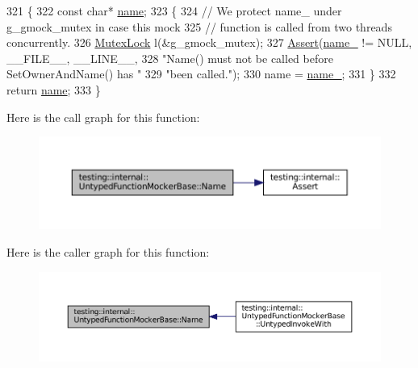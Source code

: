 \begin{DoxyCode}
321                                         \{
322   \textcolor{keyword}{const} \textcolor{keywordtype}{char}* \hyperlink{namespaceinteractive__marker_a447655961b3d3ca3c5a2a9d3d769436d}{name};
323   \{
324     \textcolor{comment}{// We protect name\_ under g\_gmock\_mutex in case this mock}
325     \textcolor{comment}{// function is called from two threads concurrently.}
326     \hyperlink{namespacetesting_1_1internal_a08b187c6cc4e28400aadf9a32fccc8de}{MutexLock} l(&g\_gmock\_mutex);
327     \hyperlink{namespacetesting_1_1internal_a7a259643b7f2d23ce2b757728df42c99}{Assert}(\hyperlink{classtesting_1_1internal_1_1UntypedFunctionMockerBase_a2d472077b9a8d3758caaec5770259f70}{name\_} != NULL, \_\_FILE\_\_, \_\_LINE\_\_,
328            \textcolor{stringliteral}{"Name() must not be called before SetOwnerAndName() has "}
329            \textcolor{stringliteral}{"been called."});
330     name = \hyperlink{classtesting_1_1internal_1_1UntypedFunctionMockerBase_a2d472077b9a8d3758caaec5770259f70}{name\_};
331   \}
332   \textcolor{keywordflow}{return} \hyperlink{namespaceinteractive__marker_a447655961b3d3ca3c5a2a9d3d769436d}{name};
333 \}
\end{DoxyCode}
Here is the call graph for this function\+:
\nopagebreak
\begin{figure}[H]
\begin{center}
\leavevmode
\includegraphics[width=350pt]{classtesting_1_1internal_1_1UntypedFunctionMockerBase_ae90a5b5d48db1e99634bc6ff39ded335_cgraph}
\end{center}
\end{figure}
Here is the caller graph for this function\+:
\nopagebreak
\begin{figure}[H]
\begin{center}
\leavevmode
\includegraphics[width=350pt]{classtesting_1_1internal_1_1UntypedFunctionMockerBase_ae90a5b5d48db1e99634bc6ff39ded335_icgraph}
\end{center}
\end{figure}
\mbox{\label{classtesting_1_1internal_1_1UntypedFunctionMockerBase_a0cd3dd14b92c714eab690c9597f32ffd}} 
